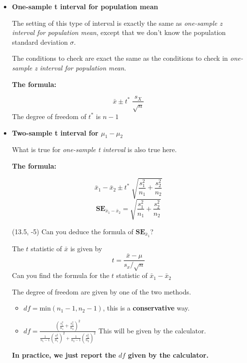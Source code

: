 \documentclass[a4paper, 12pt,twoside]{book}
\begin{document}
  \begin{itemize}
      \item \textbf{One-sample t interval for population mean}\vspace{0.3cm}
      
      The setting of this type of interval is exactly the same as \textit{one-sample z interval for population mean}, except that we don't know the population standard deviation $\sigma$.\vspace{0.3cm}
      
      The conditions to check are exact the same as the conditions to check in \textit{one-sample z interval for population mean}.\vspace{0.3cm}
      
      \textbf{The formula:}
      
          $$\bar{x}\pm t^* \; \frac{s_X}{\sqrt{n}}$$
     The degree of freedom of $t^*$ is $n-1$
  \item \textbf{Two-sample t interval for $\mu_1-\mu_2$}        \vspace{0.3cm}
  
  What is true for \textit{one-sample t interval} is also true here.\vspace{0.3cm}\vspace{0.3cm}
  
  \textbf{The formula:}\vspace{0.3cm}
  
   $$\bar{x}_1-\bar{x}_2\pm t^* \; \sqrt{\frac{s_1^2}{n_1} + \frac{s_2^2}{n_2}}$$
   $$\textbf{SE}_{\bar{x}_1-\bar{x}_2} = \sqrt{\frac{s_1^2}{n_1} + \frac{s_2^2}{n_2}}$$
   
    \begin{textblock}{4.8}(13.5, -5)
  Can you deduce the formula of $\textbf{SE}_{\bar{x}_1}$?
  
   The $t$ statistic of $\bar{x}$ is given by $$t = \frac{\bar{x}-\mu}{s_x/\sqrt{n}}$$
   Can you find the formula for the $t$ statistic of $\bar{x}_1 - \bar{x}_2$
 \end{textblock}

    
 The degree of freedom are given by one of the two methods.
     \begin{itemize}
        \item $df=\text{min}(n_1-1, n_2-1)$, this is a \textbf{conservative} way.
        \item $\displaystyle{df = \frac{(\frac{s_1^2}{n_1}+\frac{s_2^2}{n_2})^2}
        {\frac{1}{n_1-1}(\frac{s_1^2}{n_1})^2 + \frac{1}{n_2-1}(\frac{s_2^2}{n_2})^2}}$
        This will be given by the calculator.
     \end{itemize}
\textbf{ In practice, we just report the $df$ given by the calculator.}


\end{itemize}
\end{document}
